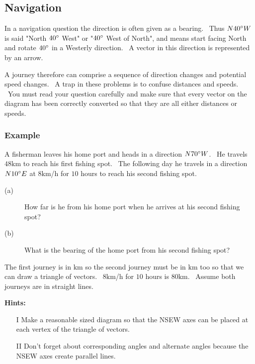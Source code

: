 \subsection{Navigation}
In a navigation question the direction is often given as a bearing. \ Thus $N 40 \mbox{{\ensuremath{{}^\circ}}} W$ is said "North $40 \mbox{{\ensuremath{{}^\circ}}}$ West" or "$40 \mbox{{\ensuremath{{}^\circ}}}$ West of North", and means start facing North and rotate $40 \mbox{{\ensuremath{{}^\circ}}}$ in a Westerly direction. \ A vector in this direction
is represented by an arrow. 

   
\setlength\fboxrule{0in}\setlength\fboxsep{0.2in}


A journey therefore can comprise a sequence of direction changes and potential speed changes. \ A
trap in these problems is to confuse distances and speeds. \ You must read your question carefully and make sure
that every vector on the diagram has been correctly converted so that they are all either distances or speeds. 

\subsubsection{Example}
A fisherman leaves his home port and heads in a direction $N 70 \mbox{{\ensuremath{{}^\circ}}} W$. \ He travels $48 \mbox{km}$ to reach his first fishing spot. \ The following
day he travels in a direction $N 10 \mbox{{\ensuremath{{}^\circ}}} E$ at $8 \mbox{km}$/$\mbox{h}$ for $10$ hours to reach his second fishing spot. 


\begin{description}
\item [(a)] How far is he from his home port when he arrives at his second
fishing spot? 

\item [(b)] What is the bearing of the home
port from his second fishing spot? \end{description}

The first journey is in $\mbox{km}$ so the second journey must be in $\mbox{km}$ too so that we can draw a triangle of vectors. \ $8 \mbox{km}$/$\mbox{h}$ for $10$ hours is $80 \mbox{km}$. \ Assume both journeys are in straight lines. 

\textbf{Hints: } 


\begin{enumerate}
\item [I] Make a reasonable sized diagram so that the NSEW axes can be placed at each
vertex of the triangle of vectors. 

\item [II] Don't forget about corresponding
angles and alternate angles because the NSEW axes create parallel lines. \end{enumerate}



